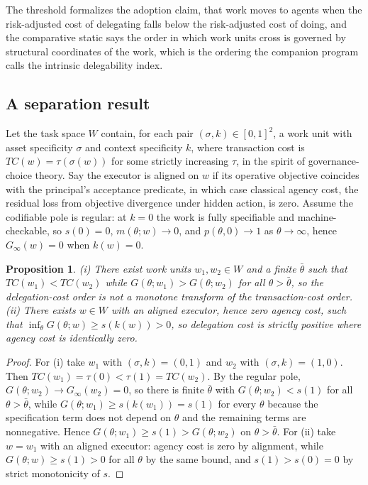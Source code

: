 \documentclass[10pt]{article}
\newtheorem{proposition}{Proposition}
\theoremstyle{remark}
\begin{document}
The threshold formalizes the adoption claim, that work moves to agents when the risk-adjusted cost of delegating falls below the risk-adjusted cost of doing, and the comparative static says the order in which work units cross is governed by structural coordinates of the work, which is the ordering the companion program calls the intrinsic delegability index.

\subsection{A separation result}

Let the task space $W$ contain, for each pair $(\sigma,k)\in[0,1]^2$, a work unit with asset specificity $\sigma$ and context specificity $k$, where transaction cost is $TC(w)=\tau(\sigma(w))$ for some strictly increasing $\tau$, in the spirit of governance-choice theory. Say the executor is aligned on $w$ if its operative objective coincides with the principal's acceptance predicate, in which case classical agency cost, the residual loss from objective divergence under hidden action, is zero. Assume the codifiable pole is regular: at $k=0$ the work is fully specifiable and machine-checkable, so $s(0)=0$, $m(\theta;w)\to0$, and $p(\theta,0)\to1$ as $\theta\to\infty$, hence $G_\infty(w)=0$ when $k(w)=0$.

\begin{proposition}\label{p:separation}
(i) There exist work units $w_1,w_2\in W$ and a finite $\bar\theta$ such that $TC(w_1)<TC(w_2)$ while $G(\theta;w_1)>G(\theta;w_2)$ for all $\theta>\bar\theta$, so the delegation-cost order is not a monotone transform of the transaction-cost order. (ii) There exists $w\in W$ with an aligned executor, hence zero agency cost, such that $\inf_\theta G(\theta;w)\ge s(k(w))>0$, so delegation cost is strictly positive where agency cost is identically zero.
\end{proposition}

\begin{proof}
For (i) take $w_1$ with $(\sigma,k)=(0,1)$ and $w_2$ with $(\sigma,k)=(1,0)$. Then $TC(w_1)=\tau(0)<\tau(1)=TC(w_2)$. By the regular pole, $G(\theta;w_2)\to G_\infty(w_2)=0$, so there is finite $\bar\theta$ with $G(\theta;w_2)<s(1)$ for all $\theta>\bar\theta$, while $G(\theta;w_1)\ge s(k(w_1))=s(1)$ for every $\theta$ because the specification term does not depend on $\theta$ and the remaining terms are nonnegative. Hence $G(\theta;w_1)\ge s(1)>G(\theta;w_2)$ on $\theta>\bar\theta$. For (ii) take $w=w_1$ with an aligned executor: agency cost is zero by alignment, while $G(\theta;w)\ge s(1)>0$ for all $\theta$ by the same bound, and $s(1)>s(0)=0$ by strict monotonicity of $s$.
\end{proof}
\end{document}
